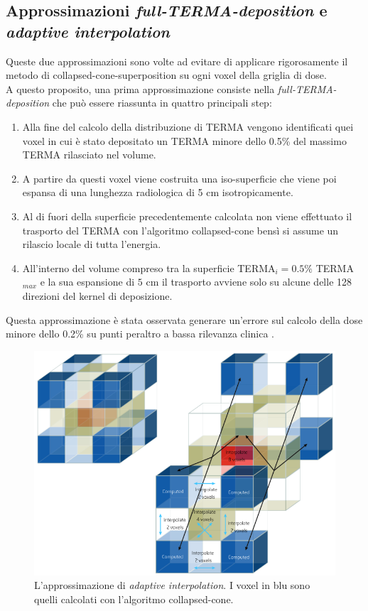 {\subsection{Approssimazioni \textit{full-TERMA-deposition} e \textit{adaptive interpolation}}
Queste due approssimazioni sono volte ad evitare di applicare rigorosamente il metodo di collapsed-cone-superposition su ogni voxel della griglia di dose.\\
A questo proposito, una prima approssimazione consiste nella \textit{full-TERMA-deposition} che può essere riassunta in quattro principali step:
\begin{enumerate}
\item Alla fine del calcolo della distribuzione di TERMA vengono identificati quei voxel in cui è stato depositato un TERMA minore dello 0.5\% del massimo TERMA rilasciato nel volume.
\item A partire da questi voxel viene costruita una iso-superficie che viene poi espansa di una lunghezza radiologica di 5 cm isotropicamente.
\item Al di fuori della superficie precedentemente calcolata non viene effettuato il trasporto del TERMA con l'algoritmo collapsed-cone bensì si assume un rilascio locale di tutta l'energia.
\item All'interno del volume compreso tra la superficie TERMA$_i= 0.5\%$ TERMA$_{max}$ e la sua espansione di $5$ cm  il trasporto avviene solo su alcune delle 128 direzioni del kernel di deposizione. 
\end{enumerate}
Questa approssimazione è stata osservata generare un'errore sul calcolo della dose minore dello 0.2\% su punti peraltro a bassa rilevanza clinica \cite{RaySearchLaboratories2014}.\\

\begin{figure}
\centering
\includegraphics[width=\textwidth]{./cap1/dose_interp.png}
\caption{L'approssimazione di \textit{adaptive interpolation}. I voxel in blu sono quelli calcolati con l'algoritmo collapsed-cone.}
\label{fig:dose_interp}
\end{figure}

}

